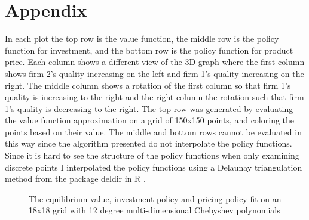 \documentclass[12pt]{article}
\begin{document}

{}

\section*{Appendix}

In each plot the top row is the value function, the middle row is the policy function for investment, and the bottom row is the policy function for product price. Each column shows a different view of the 3D graph where the first column shows firm 2's quality increasing on the left and firm 1's quality increasing on the right. The middle column shows a rotation of the first column so that firm 1's quality is increasing to the right and the right column the rotation such that firm 1's quality is decreasing to the right. The top row was generated by evaluating the value function approximation on a grid of 150x150 points, and coloring the points based on their value. The middle and bottom rows cannot be evaluated in this way since the algorithm presented do not interpolate the policy functions. Since it is hard to see the structure of the policy functions when only examining discrete points I interpolated the policy functions using a Delaunay triangulation method from the package deldir in R \citep{deldir}.

\begin{figure}[H]
  \centering
  \caption{The equilibrium value, investment policy and pricing policy fit on an 18x18 grid with 12 degree multi-dimensional Chebyshev polynomials}
\end{figure}
\end{document}
